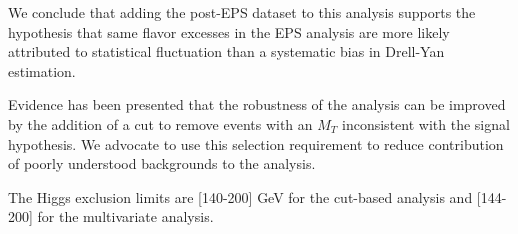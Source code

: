 \documentclass{cmspaper}
\begin{document}
We conclude that adding the post-EPS dataset to this analysis 
supports the hypothesis that same flavor excesses in the EPS
analysis are more likely attributed to statistical fluctuation
than a systematic bias in Drell-Yan estimation.

Evidence has been presented that the robustness of the analysis can be
improved by the addition of a cut to remove events with an $M_T$
inconsistent with the signal hypothesis. We advocate to use this
selection requirement to reduce contribution of poorly understood
backgrounds to the analysis.

The Higgs exclusion limits are [140-200] GeV for the cut-based analysis and
[144-200] for the multivariate analysis. 

\begin{figure}[!htbp]
\centering
{}

\end{figure}
\end{document}
